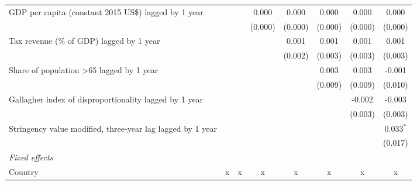 \begin{tabular}{lccccccc}
   GDP per capita (constant 2015 US\$) lagged by 1 year                                              &               &               & 0.000         & 0.000         & 0.000         & 0.000        & 0.000\\   
                                                                                                     &               &               & (0.000)       & (0.000)       & (0.000)       & (0.000)      & (0.000)\\   
   Tax revenue (\% of GDP) lagged by 1 year                                                          &               &               &               & 0.001         & 0.001         & 0.001        & 0.001\\   
                                                                                                     &               &               &               & (0.002)       & (0.003)       & (0.003)      & (0.003)\\   
   Share of population >65 lagged by 1 year                                                          &               &               &               &               & 0.003         & 0.003        & -0.001\\   
                                                                                                     &               &               &               &               & (0.009)       & (0.009)      & (0.010)\\   
   Gallagher index of disproportionality lagged by 1 year                                            &               &               &               &               &               & -0.002       & -0.003\\   
                                                                                                     &               &               &               &               &               & (0.003)      & (0.003)\\   
   Stringency value modified, three-year lag lagged by 1 year                                        &               &               &               &               &               &              & 0.033$^{*}$\\   
                                                                                                     &               &               &               &               &               &              & (0.017)\\   
   \emph{Fixed effects}\\
   Country                                                                                           & x             & x             & x             & x             & x             & x            & x\\  

\end{tabular}
